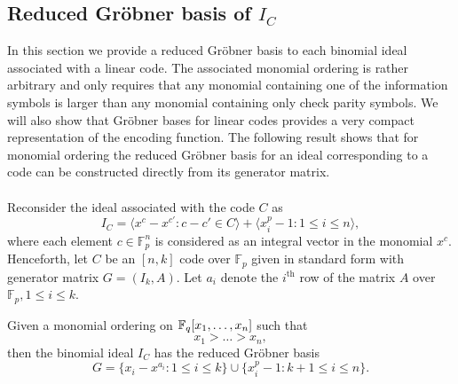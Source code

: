\documentclass[english,bachelor]{liumaiex}
\begin{document}
\subsection{Reduced Gröbner basis of $I_C$}
In this section we provide a reduced Gröbner basis to each binomial ideal associated with a linear code. The associated monomial ordering is rather arbitrary and only requires that any monomial containing one of the information symbols is larger than any monomial containing only check parity symbols. We will also show that Gröbner bases for linear codes provides a very compact representation of the encoding function. The following result shows that for monomial ordering the reduced Gröbner basis for an ideal corresponding to a code can be constructed directly from its generator matrix.\\ \\
Reconsider the ideal associated with the code $C$ as
\begin{displaymath}
I_C=\langle x^c-x^{c'}\colon c-c'\in C\rangle + \langle x_i^p-1\colon 1\leq i\leq n\rangle,
\end{displaymath}
where each element $c\in\mathbb{F}_p^n$ is considered as an integral vector in the monomial $x^c$. Henceforth, let $C$ be an $[n,k]$ code over $\mathbb{F}_p$ given in standard form with generator matrix $G=(I_k,A)$. Let $a_i$ denote the $i^\textrm{th}$ row of the matrix $A$ over $\mathbb{F}_p, 1\leq i\leq k$.
\begin{thm}
\label{thm:redgrob}
Given a monomial ordering on $\mathbb{F}_q[x_1,\dots,x_n]$ such that $$x_1>\dots>x_n,$$ then the binomial ideal $I_C$ has the reduced Gröbner basis
\begin{displaymath}
G=\{x_i-x^{a_i}\colon 1\leq i\leq k\}\cup\{x_i^p-1\colon k+1\leq i\leq n\}.
\end{displaymath}
\end{thm}
\end{document}
